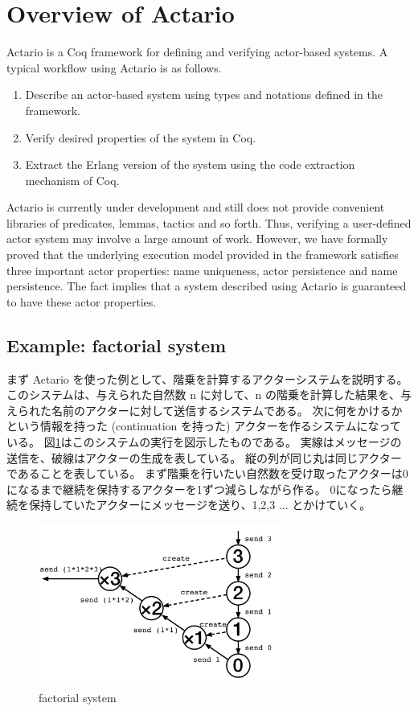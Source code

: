 \section{Overview of Actario}
\label{sec:overview}

Actario is a Coq framework for defining and verifying actor-based
systems. A typical workflow using Actario is as follows.
\begin{enumerate}
\item Describe an actor-based system using types and notations defined in the framework.
\item Verify desired properties of the system in Coq.
\item Extract the Erlang version of the system using the code extraction mechanism of Coq.
\end{enumerate}

Actario is currently under development and still does not provide
convenient libraries of predicates, lemmas, tactics and so
forth. Thus, verifying a user-defined actor system may involve a large
amount of work. However, we have formally proved that the underlying
execution model provided in the framework satisfies three important
actor properties: name uniqueness, actor persistence and name
persistence. The fact implies that a system described using Actario is
guaranteed to have these actor properties.


\subsection{Example: factorial system}
まず Actario を使った例として、階乗を計算するアクターシステムを説明する。
このシステムは、与えられた自然数 n に対して、n の階乗を計算した結果を、与えられた名前のアクターに対して送信するシステムである。
次に何をかけるかという情報を持った (continuation を持った) アクターを作るシステムになっている。
図\ref{fig:fact}はこのシステムの実行を図示したものである。
実線はメッセージの送信を、破線はアクターの生成を表している。
縦の列が同じ丸は同じアクターであることを表している。
まず階乗を行いたい自然数を受け取ったアクターは0になるまで継続を保持するアクターを1ずつ減らしながら作る。
0になったら継続を保持していたアクターにメッセージを送り、1,2,3 ... とかけていく。

\begin{figure}[t]
  \centering
  \includegraphics[width=8cm]{./images/fact.pdf}
  \caption{factorial system}\label{fig:fact}
\end{figure}

